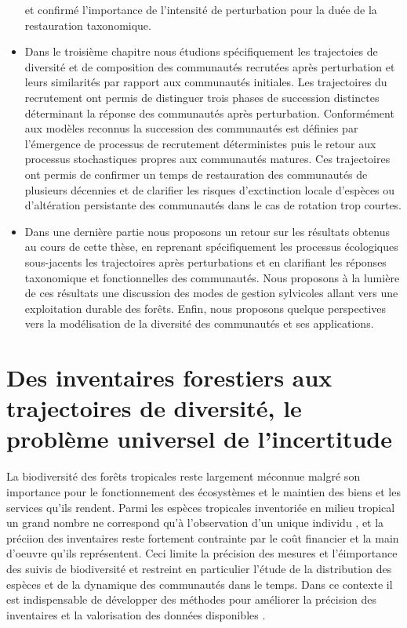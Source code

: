 \documentclass[
  11pt,
  french,
  A4paper,
  extrafontsizes,onecolumn,openright
  ]{memoir}
\begin{document}
\begin{itemize}
  et confirmé l'importance de l'intensité de perturbation pour la duée
  de la restauration taxonomique.
\item
  Dans le troisième chapitre nous étudions spécifiquement les
  trajectoies de diversité et de composition des communautés recrutées
  après perturbation et leurs similarités par rapport aux communautés
  initiales. Les trajectoires du recrutement ont permis de distinguer
  trois phases de succession distinctes déterminant la réponse des
  communautés après perturbation. Conformément aux modèles reconnus la
  succession des communautés est définies par l'émergence de processus
  de recrutement déterministes puis le retour aux processus
  stochastiques propres aux communautés matures. Ces trajectoires ont
  permis de confirmer un temps de restauration des communautés de
  plusieurs décennies et de clarifier les risques d'exctinction locale
  d'espèces ou d'altération persistante des communautés dans le cas de
  rotation trop courtes.
\item
  Dans une dernière partie nous proposons un retour sur les résultats
  obtenus au cours de cette thèse, en reprenant spécifiquement les
  processus écologiques sous-jacents les trajectoires après
  perturbations et en clarifiant les réponses taxonomique et
  fonctionnelles des communautés. Nous proposons à la lumière de ces
  résultats une discussion des modes de gestion sylvicoles allant vers
  une exploitation durable des forêts. Enfin, nous proposons quelque
  perspectives vers la modélisation de la diversité des communautés et
  ses applications.
\end{itemize}

\chapter{Des inventaires forestiers aux trajectoires de diversité, le
problème universel de
l'incertitude}\label{des-inventaires-forestiers-aux-trajectoires-de-diversite-le-probleme-universel-de-lincertitude}

La biodiversité des forêts tropicales reste largement méconnue malgré
son importance pour le fonctionnement des écosystèmes et le maintien des
biens et les services qu'ils rendent. Parmi les espèces tropicales
inventoriée en milieu tropical un grand nombre ne correspond qu'à
l'observation d'un unique individu \autocite{Feeley2011}, et la préciion
des inventaires reste fortement contrainte par le coût financier et la
main d'oeuvre qu'ils représentent. Ceci limite la précision des mesures
et l'éimportance des suivis de biodiversité et restreint en particulier
l'étude de la distribution des espèces et de la dynamique des
communautés dans le temps. Dans ce contexte il est indispensable de
développer des méthodes pour améliorer la précision des inventaires et
la valorisation des données disponibles \autocite{Baraloto2012}.
\end{document}

